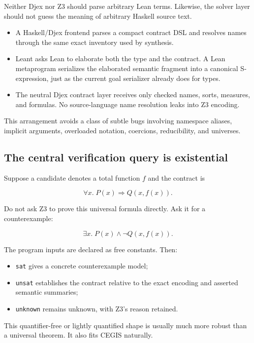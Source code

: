 \documentclass[11pt,oneside]{article}
\newcommand{\code}[1]{\texttt{#1}}
\begin{document}
Neither Djex nor Z3 should parse arbitrary Lean terms. Likewise, the solver layer
should not guess the meaning of arbitrary Haskell source text.

\begin{itemize}
  \item A Haskell/Djex frontend parses a compact contract DSL and resolves names through
        the same exact inventory used by synthesis.
  \item Leant asks Lean to elaborate both the type and the contract. A Lean metaprogram
        serializes the elaborated semantic fragment into a canonical S-expression,
        just as the current goal serializer already does for types.
  \item The neutral Djex contract layer receives only checked names, sorts, measures,
        and formulas. No source-language name resolution leaks into Z3 encoding.
\end{itemize}

This arrangement avoids a class of subtle bugs involving namespace aliases, implicit
arguments, overloaded notation, coercions, reducibility, and universes.

\subsection{The central verification query is existential}

Suppose a candidate denotes a total function $f$ and the contract is

\[
  \forall x.\; P(x) \Rightarrow Q(x, f(x)).
\]

Do not ask Z3 to prove this universal formula directly. Ask it for a counterexample:

\[
  \exists x.\; P(x) \land \neg Q(x, f(x)).
\]

The program inputs are declared as free constants. Then:

\begin{itemize}
  \item \code{sat} gives a concrete counterexample model;
  \item \code{unsat} establishes the contract relative to the exact encoding and
        asserted semantic summaries;
  \item \code{unknown} remains unknown, with Z3's reason retained.
\end{itemize}

This quantifier-free or lightly quantified shape is usually much more robust than a
universal theorem. It also fits CEGIS naturally.
\end{document}
